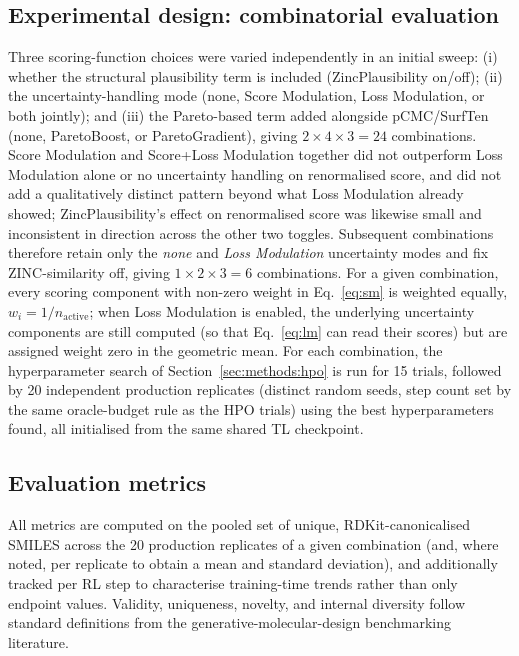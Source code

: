 \documentclass[11pt]{aime}
\begin{document}
\subsection{Experimental design: combinatorial evaluation}
\label{sec:methods:design}

Three scoring-function choices were varied independently in an initial sweep: (i) whether the structural plausibility term is included (ZincPlausibility on/off); (ii) the uncertainty-handling mode (none, Score Modulation, Loss Modulation, or both jointly); and (iii) the Pareto-based term added alongside pCMC/SurfTen (none, ParetoBoost, or ParetoGradient), giving $2\times4\times3=24$ combinations.
Score Modulation and Score+Loss Modulation together did not outperform Loss Modulation alone or no uncertainty handling on renormalised score, and did not add a qualitatively distinct pattern beyond what Loss Modulation already showed; ZincPlausibility's effect on renormalised score was likewise small and inconsistent in direction across the other two toggles.
Subsequent combinations therefore retain only the \emph{none} and \emph{Loss Modulation} uncertainty modes and fix ZINC-similarity off, giving $1\times2\times3=6$ combinations.
For a given combination, every scoring component with non-zero weight in Eq.~\ref{eq:sm} is weighted equally, $w_i=1/n_\mathrm{active}$; when Loss Modulation is enabled, the underlying uncertainty components are still computed (so that Eq.~\ref{eq:lm} can read their scores) but are assigned weight zero in the geometric mean.
For each combination, the hyperparameter search of Section~\ref{sec:methods:hpo} is run for 15 trials, followed by 20 independent production replicates (distinct random seeds, step count set by the same oracle-budget rule as the HPO trials) using the best hyperparameters found, all initialised from the same shared TL checkpoint.

\subsection{Evaluation metrics}
\label{sec:methods:evaluation}

All metrics are computed on the pooled set of unique, RDKit-canonicalised SMILES across the 20 production replicates of a given combination (and, where noted, per replicate to obtain a mean and standard deviation), and additionally tracked per RL step to characterise training-time trends rather than only endpoint values.
Validity, uniqueness, novelty, and internal diversity follow standard definitions from the generative-molecular-design benchmarking literature\cite{polykovskiy_molecular_2020}.
\end{document}
